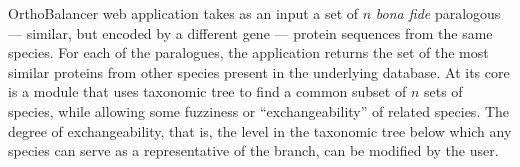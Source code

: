 OrthoBalancer web application takes as an input a set of  $n$ \emph{bona fide}
paralogous --- similar, but encoded by a different gene --- protein sequences from
the same species. For each of the paralogues, the application returns the set of
the most similar proteins from other species present in the underlying database.
At its core is a module that uses taxonomic tree to find a common subset of $n$
sets of species, while allowing some fuzziness or ``exchangeability'' of related
species.  The degree of exchangeability, that is, the level in the taxonomic
tree below which any species can serve as a representative of the branch, can be
modified by the user. 

